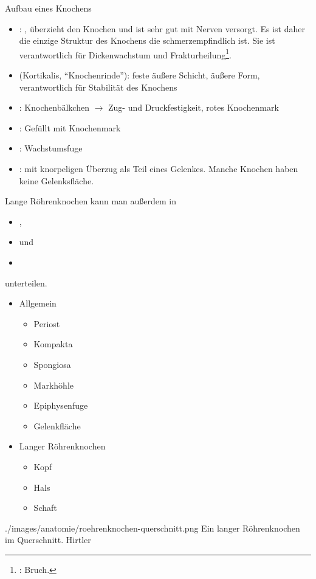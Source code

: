 {Aufbau eines Knochens}
{%
\begin{itemize}
  \item {}: , überzieht den Knochen und
  ist sehr gut mit Nerven versorgt. Es ist daher die einzige Struktur des Knochens die
  schmerzempfindlich ist. Sie ist verantwortlich für
  Dickenwachstum und Frakturheilung\footnote{:
  Bruch.}.
  \item {} (Kortikalis, \protect\enquote{Knochenrinde}):
  feste äußere Schicht, äußere Form, verantwortlich für Stabilität des Knochens
  \item {}: Knochenbälkchen
  ${\rightarrow}$ Zug- und Druckfestigkeit, rotes Knochenmark
  \item {}: Gefüllt mit Knochenmark
  \item {}:  Wachstumsfuge
  \item {}: mit knorpeligen Überzug als Teil eines Gelenkes.
  Manche Knochen haben keine Gelenksfläche.
\end{itemize}
Lange Röhrenknochen kann man außerdem in 
\begin{itemize}
    \item {},
    \item {} und
    \item {} 
\end{itemize}
unterteilen.
}{
\begin{itemize}
  \item Allgemein
  \begin{itemize}
    \item Periost
    \item Kompakta
    \item Spongiosa
    \item Markhöhle
    \item Epiphysenfuge
    \item Gelenkfläche
  \end{itemize}
  \item Langer Röhrenknochen
  \begin{itemize}
    \item {Kopf}
    \item {Hals}
    \item {Schaft}
  \end{itemize}
\end{itemize}
}
{./images/anatomie/roehrenknochen-querschnitt.png}
{Ein langer Röhrenknochen im Querschnitt.}
{Hirtler}


